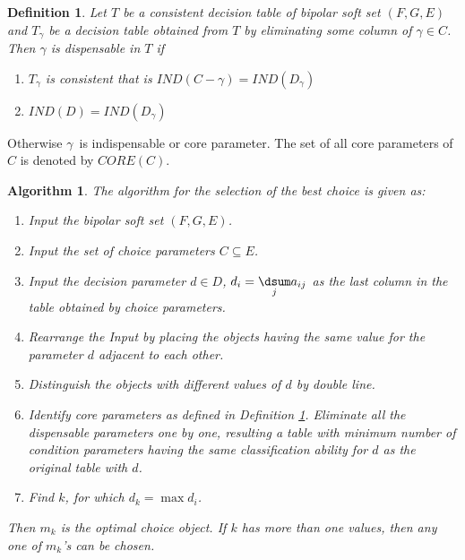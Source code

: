 \documentclass{amsart}
\theoremstyle{plain}
\newtheorem{algorithm}{Algorithm}
\newtheorem{definition}{Definition}
\numberwithin{equation}{section}
\begin{document}
\begin{definition}
\label{defcore}Let $T$ be a consistent decision table of bipolar soft set $(F,G,E)$ and $T_{\gamma }$ be a decision table obtained from $T$ by
eliminating some column of $\gamma \in C$. Then $\gamma $ is dispensable in $T$ if

\begin{enumerate}
\item $T_{\gamma }$ is consistent that is $IND(C-\gamma )=IND(D_{\gamma })$

\item $IND(D)=IND(D_{\gamma })$
\end{enumerate}
\end{definition}

Otherwise $\gamma $\ is indispensable or core parameter. The set of all core
parameters of $C$ is denoted by $CORE(C)$.

\begin{algorithm}
The algorithm for the selection of the best choice is given as:

\begin{enumerate}
\item Input the bipolar soft set $(F,G,E)$.

\item Input the set of choice parameters $C\subseteq E$.

\item Input the decision parameter $d\in D$, $d_{i}=\underset{j}{\dsum }a_{ij}$ as the last column in the table obtained by choice parameters.

\item Rearrange the Input by placing the objects having the same value for
the parameter $d$ adjacent to each other.

\item Distinguish the objects with different values of $d$ by double line.

\item Identify core parameters as defined in Definition \ref{defcore}.
Eliminate all the dispensable parameters one by one, resulting a table with
minimum number of condition parameters having the same classification
ability for $d$ as the original table with $d$.

\item Find $k$, for which $d_{k}=\max d_{i}$.
\end{enumerate}

Then $m_{k}$ is the optimal choice object. If $k$ has more than one values,
then any one of $m_{k}$'s can be chosen.
\end{algorithm}
\end{document}
